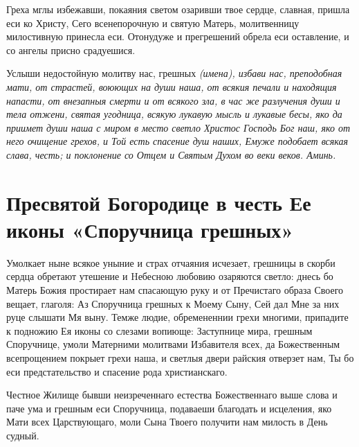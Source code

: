 Греха мглы избежавши, покаяния светом озаривши твое сердце, славная, пришла еси ко Христу, Сего всенепорочную и святую Матерь, молитвенницу милостивную принесла еси. Отонудуже и прегрешений обрела еси оставление, и со ангелы присно срадуешися.




Услыши недостойную молитву нас, грешных \itshape (имена),\normalfont{} избави нас, преподобная мати, от страстей, воюющих на души наша, от всякия печали и находящия напасти, от внезапныя смерти и от всякого зла, в час же разлучения души и тела отжени, святая угодница, всякую лукавую мысль и лукавые бесы, яко да приимет души наша с миром в место светло Христос Господь Бог наш, яко от него очищение грехов, и Той есть спасение душ наших, Емуже подобает всякая слава, честь; и поклонение со Отцем и Святым Духом во веки веков. Аминь.


\section{Пресвятой Богородице в честь Ее иконы «Споручница грешных»}
 




Умолкает ныне всякое уныние и страх отчаяния исчезает, грешницы в скорби сердца обретают утешение и Hебесною любовию озаряются светло: днесь бо Матерь Божия простирает нам спасающую руку и от Пречистаго образа Своего вещает, глаголя: Аз Споручница грешных к Моему Сыну, Сей дал Мне за них руце слышати Мя выну. Темже людие, обремененнии грехи многими, припадите к подножию Ея иконы со слезами вопиюще: Заступнице мира, грешным Споручнице, умоли Матерними молитвами Избавителя всех, да Божественным всепрощением покрыет грехи наша, и светлыя двери райския отверзет нам, Ты бо еси предстательство и спасение рода христианскаго.




Честное Жилище бывши неизреченнаго естества Божественнаго выше слова и паче ума и грешным еси Споручница, подаваеши благодать и исцеления, яко Мати всех Царствующаго, моли Сына Твоего получити нам милость в День судный.




